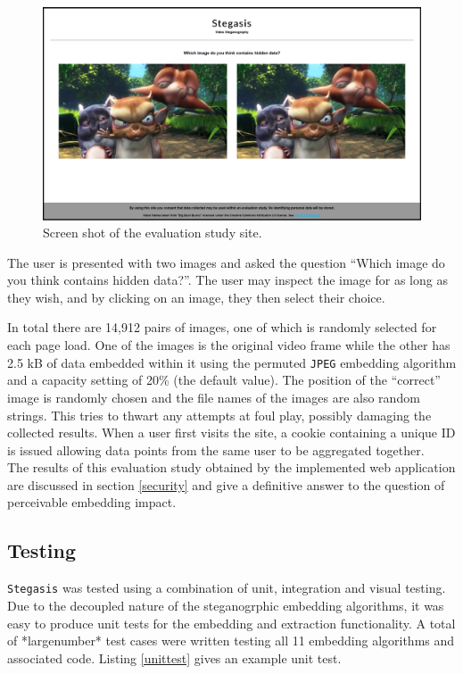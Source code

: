 \documentclass[paper=a4, fontsize=11pt,twoside]{scrartcl}
\numberwithin{table}{section}
\numberwithin{figure}{section}
\numberwithin{algorithm}{section}
\begin{document}
\begin{figure}[!h]
\centerline{\includegraphics[width=\textwidth]{images/site.png}}
\caption{Screen shot of the evaluation study site.}
\label{site}
\end{figure}

The user is presented with two images and asked the question ``Which image do you think contains hidden data?''. The user may inspect the image for as long as they wish, and by clicking on an image, they then select their choice.

In total there are 14,912 pairs of images, one of which is randomly selected for each page load. One of the images is the original video frame while the other has 2.5 kB of data embedded within it using the permuted \texttt{JPEG} embedding algorithm and a capacity setting of 20\% (the default value). The position of the ``correct'' image is randomly chosen and the file names of the images are also random strings. This tries to thwart any attempts at foul play, possibly damaging the collected results. When a user first visits the site, a cookie containing a unique ID is issued allowing data points from the same user to be aggregated together.\\

\noindent
The results of this evaluation study obtained by the implemented web application are discussed in section \ref{security} and give a definitive answer to the question of perceivable embedding impact.

\subsection{Testing}
\label{testing}

\texttt{Stegasis} was tested using a combination of unit, integration and visual testing. Due to the decoupled nature of the steganogrphic embedding algorithms, it was easy to produce unit tests for the embedding and extraction functionality. A total of *largenumber* test cases were written testing all 11 embedding algorithms and associated code. Listing \ref{unittest} gives an example unit test.
\end{document}

